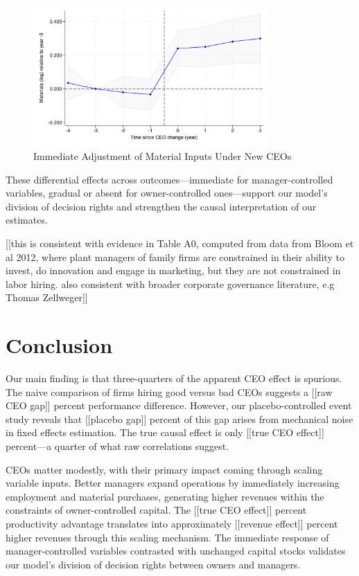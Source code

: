\documentclass[11pt,a4paper]{article}
\begin{document}
\begin{figure}[htbp]
\centering
\includegraphics[width=0.8\textwidth]{figure/event_study_lnM.pdf}
\caption{Immediate Adjustment of Material Inputs Under New CEOs}
\label{fig:materials}
\end{figure}

These differential effects across outcomes—immediate for manager-controlled variables, gradual or absent for owner-controlled ones—support our model's division of decision rights and strengthen the causal interpretation of our estimates.

[[this is consistent with evidence in Table A0, computed from data from Bloom et al 2012, where plant managers of family firms are constrained in their ability to invest, do innovation and engage in marketing, but they are not constrained in labor hiring. also consistent with broader corporate governance literature, e.g Thomas Zellweger]]

\section{Conclusion}

Our main finding is that three-quarters of the apparent CEO effect is spurious. The naive comparison of firms hiring good versus bad CEOs suggests a [[raw CEO gap]] percent performance difference. However, our placebo-controlled event study reveals that [[placebo gap]] percent of this gap arises from mechanical noise in fixed effects estimation. The true causal effect is only [[true CEO effect]] percent—a quarter of what raw correlations suggest.

CEOs matter modestly, with their primary impact coming through scaling variable inputs. Better managers expand operations by immediately increasing employment and material purchases, generating higher revenues within the constraints of owner-controlled capital. The [[true CEO effect]] percent productivity advantage translates into approximately [[revenue effect]] percent higher revenues through this scaling mechanism. The immediate response of manager-controlled variables contrasted with unchanged capital stocks validates our model's division of decision rights between owners and managers.
\end{document}
